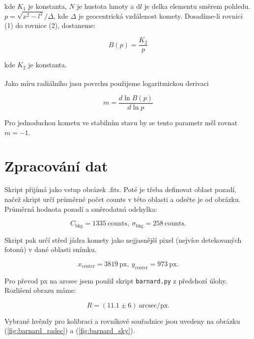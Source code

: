 \documentclass[a4paper,11pt,twocolumn]{article}
\begin{document}
        kde $K_1$ je konstanta, $N$ je hustota hmoty a $\text{d} l$ je delka elementu směrem pohledu. $p = \sqrt{x^2 - l^2}/\Delta$, kde $\Delta$ je geocentrická vzdálenost komety.
        Dosadíme-li rovnici (1) do rovnice (2), dostaneme:

        \begin{equation}
            B(p) = \frac{K_2}{p}
        \end{equation}

        kde $K_2$ je konstanta.
        
        Jako míru radiálního jasu povrchu použijeme logaritmickou derivaci \textsuperscript{\cite{1987ApJ...317..992J}}

        \begin{equation}
            m = \frac{d \ln B(p)}{d \ln p}
        \end{equation}

        Pro jednoduchou kometu ve stabilním stavu by se tento parametr měl rovnat $m = -1$.
    \section{Zpracování dat}
        Skript přijímá jako vstup obrázek .fits. Poté je třeba definovat oblast pozadí, načež skript určí průměrné počet counts v této oblasti a odečte je od obrázku. Průměrná hodnota pozadí a směrodatná odchylka:

        \begin{equation*}
            C_{\text{bkg}} = 1335 \ \text{counts},\
            \sigma_{\text{bkg}} = 258 \ \text{counts}.
        \end{equation*}
        
        Skript pak určí střed jádra komety jako nejjasnější pixel (nejvíce detekovaných fotonů) v dané oblasti snímku.

        \begin{equation*}
            x_{\text{center}} = 3819 \ \text{px},\
            y_{\text{center}} = 973 \ \text{px}.
        \end{equation*}

        Pro převod px na arcsec jsem použil skript \texttt{barnard.py} z předchozí úlohy. Rozlišení obrazu máme:

        \begin{equation*}
            R = (11.1 \pm 6) \ \text{arcsec}/\text{px}.
        \end{equation*}

        Vybrané hvězdy pro kolibraci a rovníkové souřadnice jsou uvedeny na obrázku (\ref{fig:barnard_radec}) a (\ref{fig:barnard_sky}).
\end{document}
